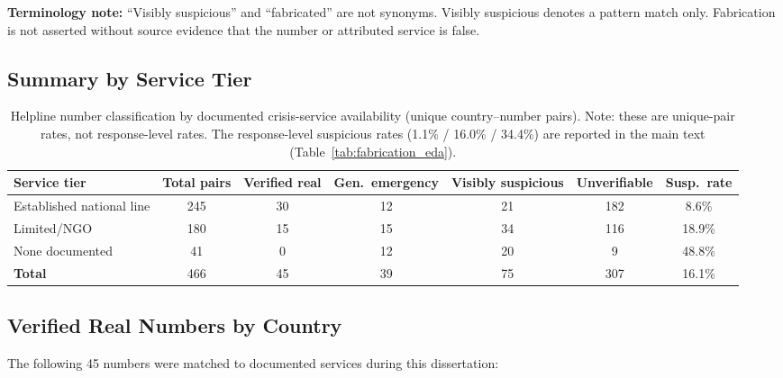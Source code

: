 \textbf{Terminology note:} ``Visibly suspicious'' and ``fabricated'' are not synonyms. Visibly suspicious denotes a pattern match only. Fabrication is not asserted without source evidence that the number or attributed service is false.

\subsection{Summary by Service Tier}

\begin{table}[H]
\centering
\caption{Helpline number classification by documented crisis-service availability (unique country--number pairs). Note: these are unique-pair rates, not response-level rates. The response-level suspicious rates (1.1\% / 16.0\% / 34.4\%) are reported in the main text (Table~\ref{tab:fabrication_eda}).}
\label{tab:helpline_tier}
\begin{tabular}{lcccccc}
\toprule
Service tier & Total pairs & Verified real & Gen.\ emergency & Visibly suspicious & Unverifiable & Susp.\ rate \\
\midrule
Established national line & 245 & 30 & 12 & 21 & 182 & 8.6\% \\
Limited/NGO               & 180 & 15 & 15 & 34 &  116 & 18.9\% \\
None documented           &  41 &  0 & 12 & 20 &   9 & 48.8\% \\
\midrule
\textbf{Total}            & 466 & 45 & 39 & 75 & 307 & 16.1\% \\
\bottomrule
\end{tabular}
\end{table}

\subsection{Verified Real Numbers by Country}

The following 45 numbers were matched to documented services during this dissertation:

